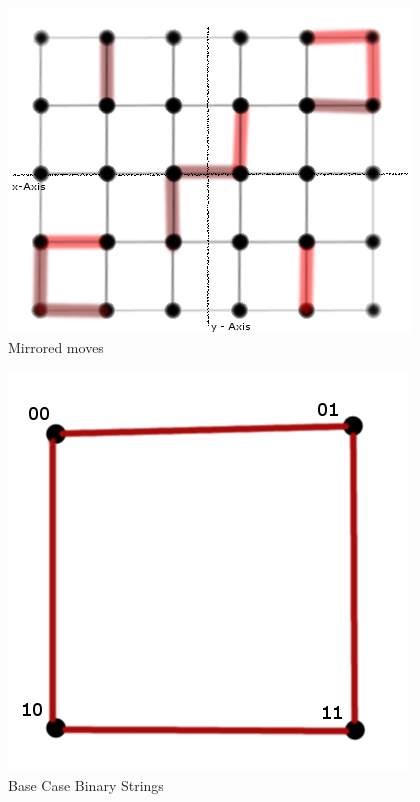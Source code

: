 \documentclass[12pt]{article}
\begin{document}
\begin{figure}[p]
 \centering
 \includegraphics[scale=0.5]{fig3}
 \caption{Mirrored moves}
\end{figure}

\begin{figure}[p]
 \centering
 \includegraphics[scale=0.5]{fig6}
 \caption{Base Case Binary Strings}
\end{figure}
\end{document}
